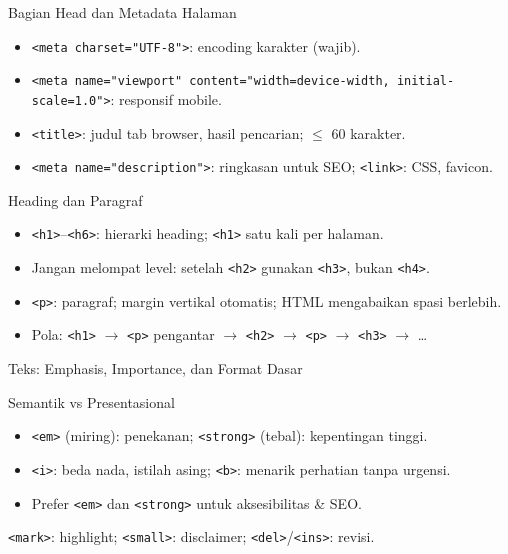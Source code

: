 \documentclass[handout]{beamer}
\begin{document}
\begin{frame}{Bagian Head dan Metadata Halaman}
	\begin{itemize}
		\item \texttt{<meta charset="UTF-8">}: encoding karakter (wajib).
		\item \texttt{<meta name="viewport" content="width=device-width, initial-scale=1.0">}: responsif mobile.
		\item \texttt{<title>}: judul tab browser, hasil pencarian; $\leq$ 60 karakter.
		\item \texttt{<meta name="description">}: ringkasan untuk SEO; \texttt{<link>}: CSS, favicon.
	\end{itemize}
\end{frame}

\begin{frame}{Heading dan Paragraf}
	\begin{itemize}
		\item \texttt{<h1>}--\texttt{<h6>}: hierarki heading; \texttt{<h1>} satu kali per halaman.
		\item Jangan melompat level: setelah \texttt{<h2>} gunakan \texttt{<h3>}, bukan \texttt{<h4>}.
		\item \texttt{<p>}: paragraf; margin vertikal otomatis; HTML mengabaikan spasi berlebih.
		\item Pola: \texttt{<h1>} $\to$ \texttt{<p>} pengantar $\to$ \texttt{<h2>} $\to$ \texttt{<p>} $\to$ \texttt{<h3>} $\to$ \ldots
	\end{itemize}
\end{frame}

\begin{frame}{Teks: Emphasis, Importance, dan Format Dasar}
	\begin{block}{Semantik vs Presentasional}
		\begin{itemize}
			\item \texttt{<em>} (miring): penekanan; \texttt{<strong>} (tebal): kepentingan tinggi.
			\item \texttt{<i>}: beda nada, istilah asing; \texttt{<b>}: menarik perhatian tanpa urgensi.
			\item Prefer \texttt{<em>} dan \texttt{<strong>} untuk aksesibilitas \& SEO.
		\end{itemize}
	\end{block}
	\texttt{<mark>}: highlight; \texttt{<small>}: disclaimer; \texttt{<del>}/\texttt{<ins>}: revisi.
\end{frame}
\end{document}
